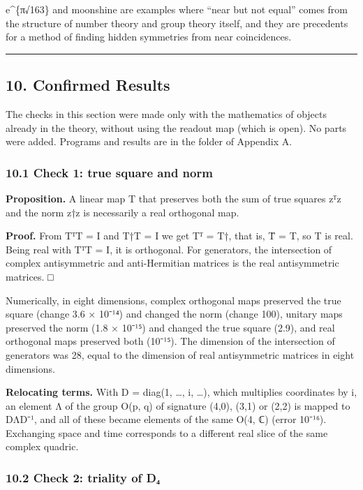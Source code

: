 \documentclass[
  a4paper,
]{article}
\begin{document}
e\^{}\{π√163\} and moonshine are examples where ``near but not equal''
comes from the structure of number theory and group theory itself, and
they are precedents for a method of finding hidden symmetries from near
coincidences.

\begin{center}\rule{0.5\linewidth}{0.5pt}\end{center}

\subsection{10. Confirmed Results}\label{confirmed-results}

The checks in this section were made only with the mathematics of
objects already in the theory, without using the readout map (which is
open). No parts were added. Programs and results are in the folder of
Appendix A.

\subsubsection{10.1 Check 1: true square and
norm}\label{check-1-true-square-and-norm}

\textbf{Proposition.} A linear map T that preserves both the sum of true
squares zᵀz and the norm z†z is necessarily a real orthogonal map.

\textbf{Proof.} From TᵀT = I and T†T = I we get Tᵀ = T†, that is, T̄ = T,
so T is real. Being real with TᵀT = I, it is orthogonal. For generators,
the intersection of complex antisymmetric and anti-Hermitian matrices is
the real antisymmetric matrices. □

Numerically, in eight dimensions, complex orthogonal maps preserved the
true square (change 3.6 × 10⁻¹⁴) and changed the norm (change 100),
unitary maps preserved the norm (1.8 × 10⁻¹⁵) and changed the true
square (2.9), and real orthogonal maps preserved both (10⁻¹⁵). The
dimension of the intersection of generators was 28, equal to the
dimension of real antisymmetric matrices in eight dimensions.

\textbf{Relocating terms.} With D = diag(1, \ldots, i, \ldots), which
multiplies coordinates by i, an element Λ of the group O(p, q) of
signature (4,0), (3,1) or (2,2) is mapped to DΛD⁻¹, and all of these
became elements of the same O(4, ℂ) (error 10⁻¹⁶). Exchanging space and
time corresponds to a different real slice of the same complex quadric.

\subsubsection{10.2 Check 2: triality of
D₄}\label{check-2-triality-of-dux2084}
\end{document}

